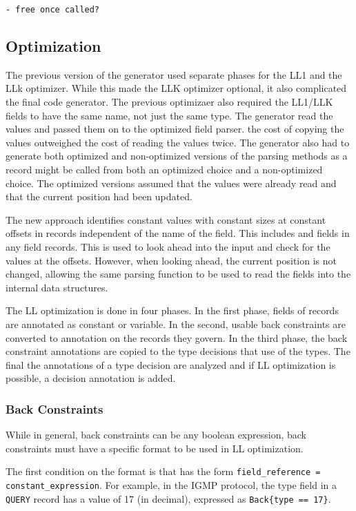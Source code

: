 \documentclass[12pt,oneside,letterpaper]{article}
\begin{document}
\begin{verbatim}
- free once called?
\end{verbatim}

\subsection{Optimization}
\label{sec:Opt}
The previous version of the generator used separate phases for the LL1 and the LLk optimizer. While this made the LLK optimizer optional, it also complicated the final code generator. The previous optimizaer also required the LL1/LLK fields to have the same name, not just the same type. The generator read the values and passed them on to the optimized field parser. the cost of copying the values outweighed the cost of reading the values twice. The generator also had to generate both optimized and non-optimized versions of the parsing methods as a record might be called from both an optimized choice and a non-optimized choice. The optimized versions assumed that the values were already read and that the current position had been updated.

The new approach identifies constant values with constant sizes at  constant offsets in records independent of the name of the field. This includes and fields in any field records. This is used to look ahead into the input and check for the values at the offsets. However, when looking ahead, the current position is not changed, allowing the same parsing function to be used to read the fields into the internal data structures.

The LL optimization is done in four phases. In the first phase, fields of records are annotated as constant or variable. In the second, usable back constraints are converted to annotation on the records they govern. In the third phase, the back constraint annotations are copied to the type decisions that use of the types. The final the annotations of a type decision are analyzed and if LL optimization is possible, a decision annotation is added. 

\subsubsection{Back Constraints}

While in general, back constraints can be any boolean expression, back constraints must have a specific format to be used in LL optimization. 

The first condition on the format is that has the form \texttt{field\_reference = constant\_expression}. For example, in the IGMP protocol, the type field in a \texttt{QUERY} record has a value of 17 (in decimal), expressed as  \texttt{Back\{type == 17\}}.
\end{document}
